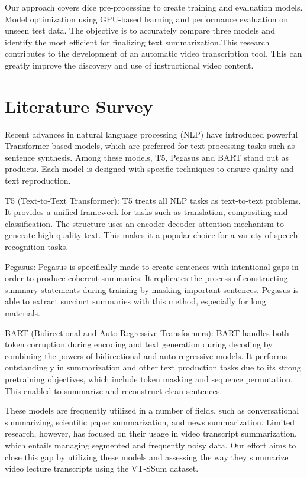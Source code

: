\documentclass[conference]{IEEEtran}
\begin{document}
Our approach covers dice pre-processing to create training and evaluation models. Model optimization using GPU-based learning and performance evaluation on unseen test data. The objective is to accurately compare three models and identify the most efficient for finalizing text summarization.This research contributes to the development of an automatic video transcription tool. This can greatly improve the discovery and use of instructional video content.

\section{Literature Survey}
Recent advances in natural language processing (NLP) have introduced powerful Transformer-based models, which are preferred for text processing tasks such as sentence synthesis. Among these models, T5, Pegasus and BART stand out as products. Each model is designed with specific techniques to ensure quality and text reproduction.

T5 (Text-to-Text Transformer): T5 treats all NLP tasks as text-to-text problems. It provides a unified framework for tasks such as translation, compositing and classification. The structure uses an encoder-decoder attention mechanism to generate high-quality text. This makes it a popular choice for a variety of speech recognition tasks.

Pegasus: Pegasus is specifically made to create sentences with intentional gaps in order to produce coherent summaries. It replicates the process of constructing summary statements during training by masking important sentences. Pegasus is able to extract succinct summaries with this method, especially for long materials.

BART (Bidirectional and Auto-Regressive Transformers): BART handles both token corruption during encoding and text generation during decoding by combining the powers of bidirectional and auto-regressive models. It performs outstandingly in summarization and other text production tasks due to its strong pretraining objectives, which include token masking and sequence permutation. This enabled to summarize and reconstruct clean sentences.

These models are frequently utilized in a number of fields, such as conversational summarizing, scientific paper summarization, and news summarization. Limited research, however, has focused on their usage in video transcript summarization, which entails managing segmented and frequently noisy data. Our effort aims to close this gap by utilizing these models and assessing the way they summarize video lecture transcripts using the VT-SSum dataset.
\end{document}

